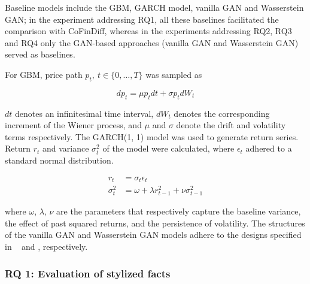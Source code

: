 \documentclass{article}
\begin{document}

Baseline models include the GBM, GARCH model, vanilla GAN and Wasserstein GAN; in the experiment addressing RQ1, all these baselines facilitated the comparison with CoFinDiff, whereas in the experiments addressing RQ2, RQ3 and RQ4 only the GAN-based approaches (vanilla GAN and Wasserstein GAN) served as baselines.

For GBM, price path $p_t, ~t\in\{0,…,T\}$ was sampled as

\begin{equation}
    d p_t = \mu p_t dt + \sigma p_t dW_t
\end{equation}

$dt$ denotes an infinitesimal time interval, $dW_t$ denotes the corresponding increment of the Wiener process, and $\mu$ and $\sigma$ denote the drift and volatility terms respectively.
The GARCH(1, 1) model was used to generate return series. Return $r_t$ and variance $\sigma^{2}_t$ of the model were calculated, where $\epsilon_t$ adhered to a standard normal distribution.

\begin{equation}
    \begin{split}
        r_t &= \sigma_t \epsilon_t \\
        \sigma^{2}_t &= \omega + \lambda r_{t-1}^2 + \nu \sigma^{2}_{t-1}
    \end{split}
\end{equation}

where $\omega$, $\lambda$, $\nu$ are the parameters that respectively capture the baseline variance, the effect of past squared returns, and the persistence of volatility.
The structures of the vanilla GAN and Wasserstein GAN models adhere to the designs specified in ~\cite{mao2017least} and \cite{arjovsky2017wasserstein}, respectively.


\subsubsection{RQ 1: Evaluation of stylized facts}
\end{document}
